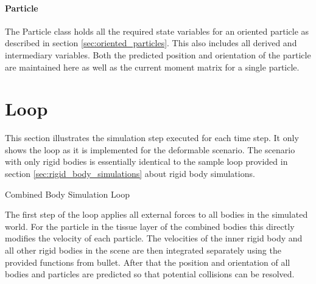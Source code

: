 \paragraph{Particle}
The Particle class holds all the required state variables for an oriented particle as described in section \ref{sec:oriented_particles}. This also includes all derived and intermediary variables. Both the predicted position and orientation of the particle are maintained here as well as the current moment matrix for a single particle.

\section{Loop}

This section illustrates the simulation step executed for each time step. It only shows the loop as it is implemented for the deformable scenario. The scenario with only rigid bodies is essentially identical to the sample loop provided in section \ref{sec:rigid_body_simulations} about rigid body simulations.

\begin{algorithm}[htb!]
\caption{Combined Body Simulation Loop}
\begin{algorithmic}[1]
\ENDFOR
{}
	\ENDFOR
	\ENDFOR
\ENDFOR
{}
		\ENDFOR
	\ENDFOR
\ENDFOR
{}
	\ENDFOR
\ENDFOR
{}
\ENDFOR

\ENDFOR
\end{algorithmic}
\end{algorithm}

The first step of the loop applies all external forces to all bodies in the simulated world. For the particle in the tissue layer of the combined bodies this directly modifies the velocity of each particle. The velocities of the inner rigid body and all other rigid bodies in the scene are then integrated separately using the provided functions from bullet. After that the position and orientation of all bodies and particles are predicted so that potential collisions can be resolved.

